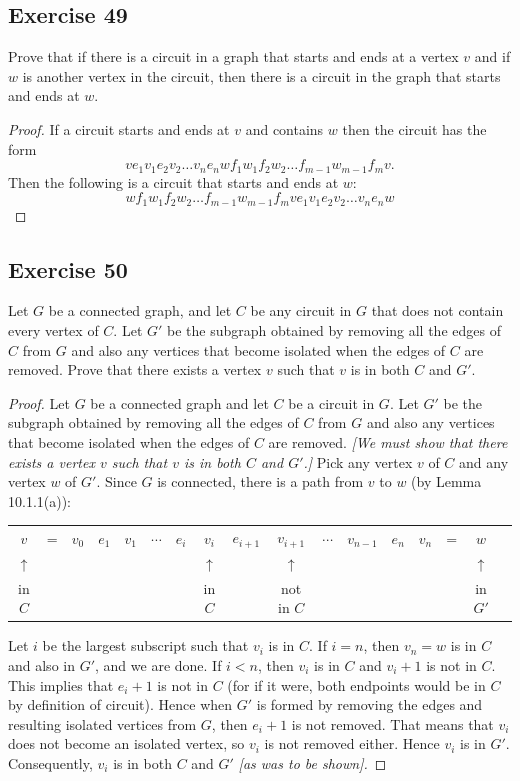 \documentclass[14pt]{extarticle}
\newcommand{\cy}{\color{cyan}}
\begin{document}
\subsection{Exercise 49}
Prove that if there is a circuit in a graph that starts and ends at a vertex \(v\) and if \(w\) is another vertex in the 
circuit, then there is a circuit in the graph that starts and ends at \(w\).

\begin{proof}
If a circuit starts and ends at \(v\) and contains \(w\) then the circuit has the form
\[
ve_1v_1e_2v_2 \ldots v_ne_nwf_1w_1f_2w_2 \ldots f_{m-1}w_{m-1}f_mv.
\]
Then the following is a circuit that starts and ends at \(w\):
\[
wf_1w_1f_2w_2 \ldots f_{m-1}w_{m-1}f_mve_1v_1e_2v_2 \ldots v_ne_nw
\]
\end{proof}

\subsection{Exercise 50}
Let \(G\) be a connected graph, and let \(C\) be any circuit in \(G\) that does not contain every vertex of \(C\). Let 
\(G'\) be the subgraph obtained by removing all the edges of \(C\) from \(G\) and also any vertices that become isolated 
when the edges of \(C\) are removed. Prove that there exists a vertex \(v\) such that \(v\) is in both \(C\) and \(G'\).

\begin{proof}
Let \(G\) be a connected graph and let \(C\) be a circuit in \(G\). Let \(G'\) be the subgraph obtained by removing all the 
edges of \(C\) from \(G\) and also any vertices that become isolated when the edges of \(C\) are removed. {\it [We must 
show that there exists a vertex \(v\) such that \(v\) is in both \(C\) and \(G'\).]} Pick any vertex \(v\) of \(C\) and 
any vertex \(w\) of \(G'\). Since \(G\) is connected, there is a path from \(v\) to \(w\) (by Lemma 10.1.1(a)):
\begin{center}
\begin{tabular}{ccccccccccccccccc}
\(v\)&=&\(v_0\)&\(e_1\)&\(v_1\)&\(\cdots\)&\(e_i\)&\(v_i\)&\(e_{i+1}\)&\(v_{i+1}\)&\(\cdots\)&\(v_{n-1}\)&\(e_n\)&\(v_n\)&=&\(w\)\\
{\cy \(\uparrow\)}&&&&&&&{\cy \(\uparrow\)}&&{\cy \(\uparrow\)}&&&&&&{\cy \(\uparrow\)}\\
{\cy in \(C\)}&&&&&&&{\cy in \(C\)}&&{\cy not in \(C\)}&&&&&&{\cy in \(G'\)}
\end{tabular}
\end{center}
Let \(i\) be the largest subscript such that \(v_i\) is in \(C\). If \(i = n\), then \(v_n = w\) is in \(C\) and also in 
\(G'\), and we are done. If \(i < n\), then \(v_i\) is in \(C\) and \(v_i + 1\) is not in \(C\). This implies that \(e_i 
+ 1\) is not in \(C\) (for if it were, both endpoints would be in \(C\) by definition of circuit). Hence when \(G'\) is 
formed by removing the edges and resulting isolated vertices from \(G\), then \(e_i + 1\) is not removed. That means that 
\(v_i\) does not become an isolated vertex, so \(v_i\) is not removed either. Hence \(v_i\) is in \(G'\). Consequently, 
\(v_i\) is in both \(C\) and \(G'\) {\it [as was to be shown].}
\end{proof}
\end{document}
